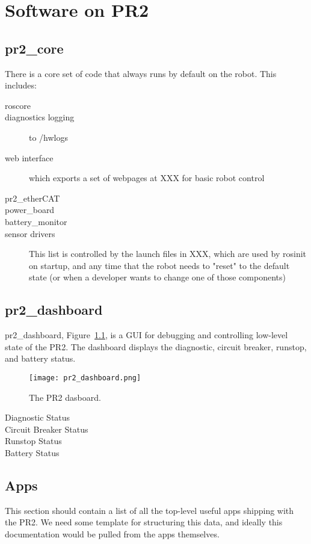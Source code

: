 \chapter{Software on PR2}
\section{pr2\_core}
There is a core set of code that always runs by default on the robot.  This includes:
\begin{description}
\item[roscore]
\item[diagnostics logging] to /hwlogs
\item[web interface] which exports a set of webpages at XXX for basic robot control
\item[pr2\_etherCAT]
\item[power\_board]
\item[battery\_monitor]
\item[sensor drivers]
This list is controlled by the launch files in XXX, which are used by rosinit on startup, and any time that the robot needs to "reset" to the default state (or when a developer wants to change one of those components)
\end{description} 
\section{pr2\_dashboard}
pr2\_dashboard, Figure~\ref{fig:dashboard}, is a GUI for debugging and controlling low-level state of the PR2. The dashboard displays the diagnostic, 
circuit breaker, runstop, and battery status.
\begin{figure}[h]
\centering
\texttt{[image: pr2\_dashboard.png]}
\caption{The PR2 dasboard.}
\label{fig:dashboard}
\end{figure}
\begin{description}
\item[Diagnostic Status]

\item[Circuit Breaker Status]

\item[Runstop Status]

\item[Battery Status]

\end{description}

\section{Apps}
This section should contain a list of all the top-level useful apps shipping with the PR2.  We need some template for structuring this data, and ideally this documentation would be pulled from the apps themselves.

